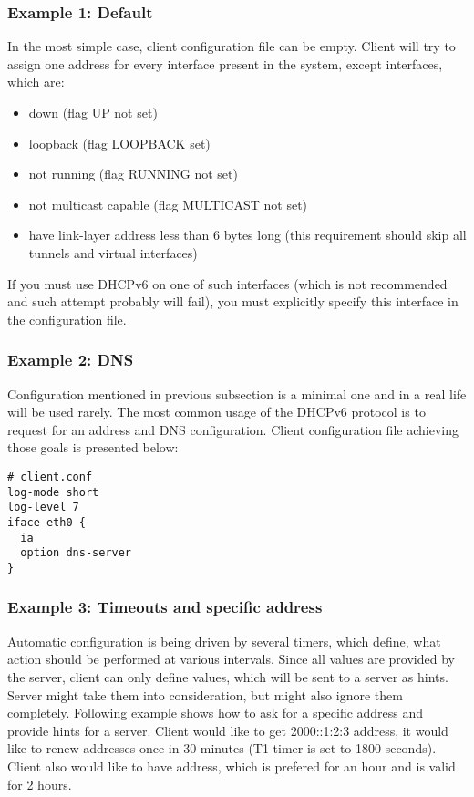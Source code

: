 \subsubsection{Example 1: Default}
In the most simple case, client configuration file can be empty. Client will try to
assign one address for every interface present in the system, except
interfaces, which are:
\begin{itemize}
\item down (flag UP not set)
\item loopback (flag LOOPBACK set)
\item not running (flag RUNNING not set)
\item not multicast capable (flag MULTICAST not set)
\item have link-layer address less than 6 bytes long (this requirement
      should skip all tunnels and virtual interfaces)
\end{itemize}

If you must use DHCPv6 on one of such interfaces (which is not
recommended and such attempt probably will fail), you must explicitly
specify this interface in the configuration file.

\subsubsection{Example 2: DNS}
Configuration mentioned in previous subsection is a minimal one and in a
real life will be used rarely. The most common usage of the DHCPv6
protocol is to request for an address and DNS configuration. Client
configuration file achieving those goals is presented below:
\begin{lstlisting}
# client.conf
log-mode short
log-level 7
iface eth0 {
  ia
  option dns-server
}
\end{lstlisting}

\subsubsection{Example 3: Timeouts and specific address}

Automatic configuration is being driven by several timers, which define,
what action should be performed at various intervals. Since all
values are provided by the server, client can only define values, which
will be sent to a server as hints. Server might take them into
consideration, but might also ignore them
completely. Following example shows how to ask for a specific address
and provide hints for a server. Client would like to get 2000::1:2:3
address, it would like to renew addresses once in 30 minutes (T1 timer
is set to 1800 seconds). Client also would like to have address, which
is prefered for an hour and is valid for 2 hours.

